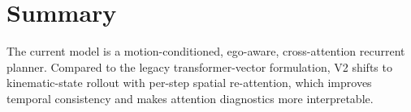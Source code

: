 \documentclass[a4paper,12pt]{article}
\begin{document}
\section{Summary}
The current model is a motion-conditioned, ego-aware, cross-attention recurrent planner.
Compared to the legacy transformer-vector formulation, V2 shifts to kinematic-state rollout with per-step spatial re-attention, which improves temporal consistency and makes attention diagnostics more interpretable.
\end{document}
